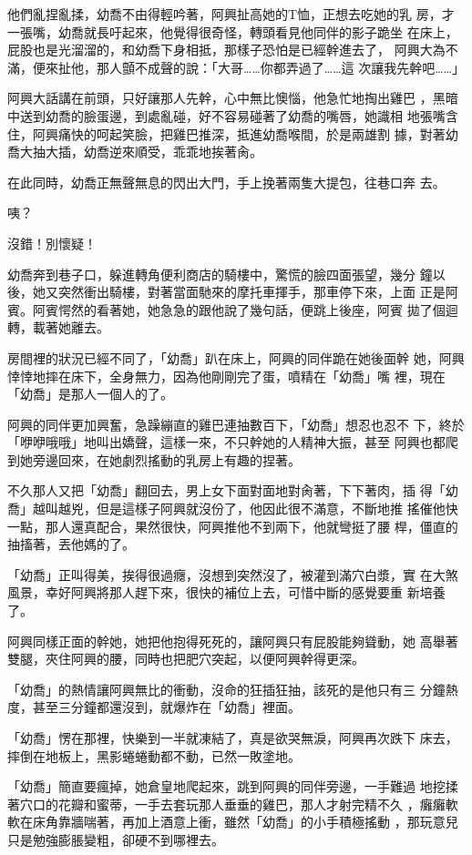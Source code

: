他們亂捏亂揉，幼喬不由得輕吟著，阿興扯高她的T恤，正想去吃她的乳
房，才一張嘴，幼喬就長吁起來，他覺得很奇怪，轉頭看見他同伴的影子跪坐
在床上，屁股也是光溜溜的，和幼喬下身相抵，那樣子恐怕是已經幹進去了，
阿興大為不滿，便來扯他，那人顫不成聲的說：「大哥……你都弄過了……這
次讓我先幹吧……」

阿興大話講在前頭，只好讓那人先幹，心中無比懊惱，他急忙地掏出雞巴
，黑暗中送到幼喬的臉蛋邊，到處亂碰，好不容易碰著了幼喬的嘴唇，她識相
地張嘴含住，阿興痛快的呵起笑臉，把雞巴推深，抵進幼喬喉間，於是兩雄割
據，對著幼喬大抽大插，幼喬逆來順受，乖乖地挨著肏。

在此同時，幼喬正無聲無息的閃出大門，手上挽著兩隻大提包，往巷口奔
去。

咦？

沒錯！別懷疑！

幼喬奔到巷子口，躲進轉角便利商店的騎樓中，驚慌的臉四面張望，幾分
鐘以後，她又突然衝出騎樓，對著當面馳來的摩托車揮手，那車停下來，上面
正是阿賓。阿賓愕然的看著她，她急急的跟他說了幾句話，便跳上後座，阿賓
拋了個迴轉，載著她離去。

房間裡的狀況已經不同了，「幼喬」趴在床上，阿興的同伴跪在她後面幹
她，阿興悻悻地摔在床下，全身無力，因為他剛剛完了蛋，噴精在「幼喬」嘴
裡，現在「幼喬」是那人一個人的了。

阿興的同伴更加興奮，急躁繃直的雞巴連抽數百下，「幼喬」想忍也忍不
下，終於「咿咿哦哦」地叫出嬌聲，這樣一來，不只幹她的人精神大振，甚至
阿興也都爬到她旁邊回來，在她劇烈搖動的乳房上有趣的捏著。

不久那人又把「幼喬」翻回去，男上女下面對面地對肏著，下下著肉，插
得「幼喬」越叫越兇，但是這樣子阿興就沒份了，他因此很不滿意，不斷地推
搖催他快一點，那人還真配合，果然很快，阿興推他不到兩下，他就彎挺了腰
桿，僵直的抽搐著，丟他媽的了。

「幼喬」正叫得美，挨得很過癮，沒想到突然沒了，被灌到滿穴白漿，實
在大煞風景，幸好阿興將那人趕下來，很快的補位上去，可惜中斷的感覺要重
新培養了。

阿興同樣正面的幹她，她把他抱得死死的，讓阿興只有屁股能夠聳動，她
高舉著雙腿，夾住阿興的腰，同時也把肥穴突起，以便阿興幹得更深。

「幼喬」的熱情讓阿興無比的衝動，沒命的狂插狂抽，該死的是他只有三
分鐘熱度，甚至三分鐘都還沒到，就爆炸在「幼喬」裡面。

「幼喬」愣在那裡，快樂到一半就凍結了，真是欲哭無淚，阿興再次跌下
床去，摔倒在地板上，黑影蜷蜷動都不動，已然一敗塗地。

「幼喬」簡直要瘋掉，她倉皇地爬起來，跳到阿興的同伴旁邊，一手難過
地挖揉著穴口的花瓣和蜜蒂，一手去套玩那人垂垂的雞巴，那人才射完精不久
，癱癱軟軟在床角靠牆喘著，再加上酒意上衝，雖然「幼喬」的小手積極搖動
，那玩意兒只是勉強膨脹變粗，卻硬不到哪裡去。

